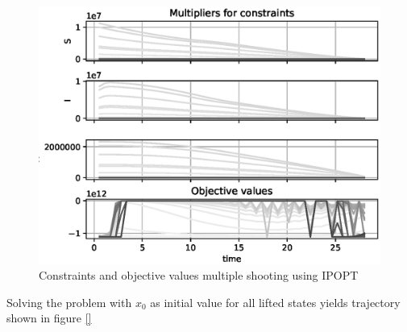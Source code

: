 \begin{figure}[H]
    \centering
    \includegraphics[width=.8\textwidth]{pythonProject/Figures/Multiple_Shooting_obj_con_IPOPT.eps}
    \caption{Constraints and objective values multiple shooting using IPOPT}
    \label{fig:MS_Cons_Obj_IPOPT}
\end{figure}

Solving the problem with $x_0$ as initial value for all lifted states yields trajectory shown in figure \ref{}





